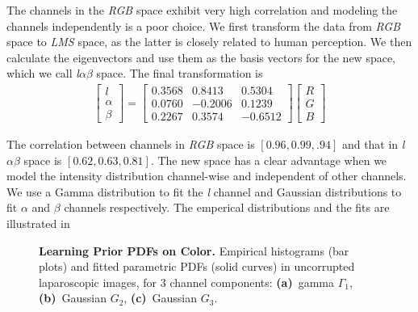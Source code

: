 The channels in the \textit{RGB} space exhibit very high correlation and modeling the channels independently is a poor choice. We first transform the data from \textit{RGB} space to \textit{LMS} space, as the latter is closely related to human perception. We then calculate the eigenvectors and use them as the basis vectors for the new space, which we call \textit{l$\alpha\beta$} space. The final transformation is 
\begin{align}
    \begin{bmatrix}
    l \\ \alpha \\ \beta
    \end{bmatrix}
    = 
    \begin{bmatrix}
    0.3568 & 0.8413 & 0.5304 \\
    0.0760 & -0.2006 & 0.1239 \\
    0.2267 & 0.3574 & -0.6512  
    \end{bmatrix}
    \begin{bmatrix}
    R \\ G \\ B
    \end{bmatrix}
\end{align}

The correlation between channels in \textit{RGB} space is $\left[ 0.96, 0.99, .94\right]$ and that in \textit{l$\alpha\beta$} space is $\left[ 0.62, 0.63, 0.81 \right]$. The new space has a clear advantage when we model the intensity distribution channel-wise and independent of other channels. We use a Gamma distribution to fit the \textit{l} channel and Gaussian distributions to fit $\alpha$ and $\beta$ channels respectively. The emperical distributions and the fits are illustrated in 

\begin{figure}[!t]
    \caption
    {
        {\bf Learning Prior PDFs on Color.}
        Empirical histograms (bar plots) and fitted parametric PDFs (solid curves) in uncorrupted laparoscopic images, for 3 channel components: {\bf
            (a)}~gamma $\Gamma_1$, {\bf (b)}~Gaussian $G_2$, {\bf (c)}~Gaussian $G_3$.
    }
    \label{fig:intensityDist}
\end{figure}


